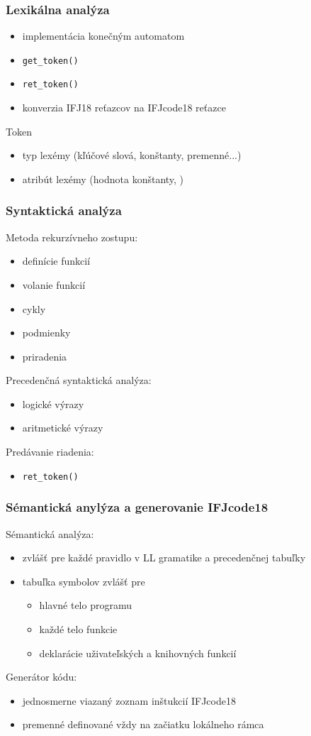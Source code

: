 \documentclass[usenames,dvipsnames]{beamer}
\begin{document}
\begin{frame}
	\frametitle{Lexikálna analýza}
	
	\begin{itemize}
	    
		\item{implementácia konečným  automatom}
		\item \texttt{get\_token()}
		\item \texttt{ret\_token()}
		\item konverzia IFJ18 reťazcov na IFJcode18 reťazce
	\end{itemize}
	Token
	\begin{itemize}
		\item typ lexémy (kľúčové slová, konštanty, premenné...)
		\item atribút lexémy (hodnota konštanty, )
	\end{itemize}

\end{frame}
%	
\begin{frame}
	\frametitle{Syntaktická analýza}
	Metoda rekurzívneho zostupu:
	\begin{itemize}
		\item definície funkcií
	 	\item volanie funkcií
		\item cykly
		\item podmienky
		\item priradenia
	\end{itemize}
	Precedenčná syntaktická analýza:
	\begin{itemize}
		\item logické výrazy
		\item aritmetické výrazy
	\end{itemize}
	Predávanie riadenia:
	\begin{itemize}
		\item \texttt{ret\_token()}
	\end{itemize}
\end{frame}
%
\begin{frame}
	\frametitle{Sémantická anylýza a generovanie IFJcode18}
	Sémantická analýza:
	\begin{itemize}
		\item zvlášť pre každé pravidlo v LL gramatike a precedenčnej tabuľky
		\item tabuľka symbolov zvlášť pre
		\begin{itemize}
			\item hlavné telo programu
			\item každé telo funkcie
			\item deklarácie uživateľských a knihovných funkcií
		\end{itemize}
	\end{itemize}
	Generátor kódu:
	\begin{itemize}
		\item jednosmerne viazaný zoznam inštukcií IFJcode18
		\item premenné definované vždy na začiatku lokálneho rámca
	\end{itemize}
\end{frame}
\end{document}
